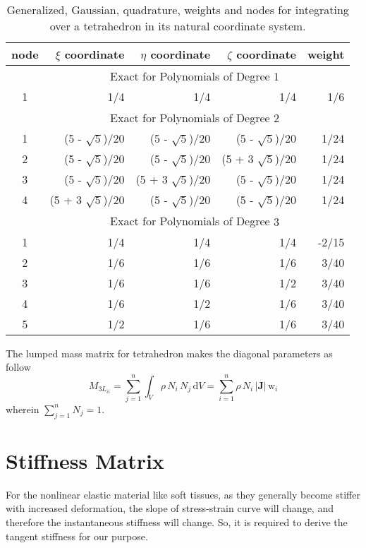 \begin{table}
    \centering
    \begin{tabular}{|c|rrrr|}
        \hline
        node & \centering $\xi$ coordinate \phantom{1234}  & 
        $\eta$ coordinate \phantom{1234} & 
        $\zeta$ coordinate \phantom{1234} & weight \phantom{12345} \\ \hline        
        & \multicolumn{4}{|c|}{Exact for Polynomials of Degree $1^{\phantom{|^|}}$} \\ 
        \hline
        1 & 1/4 & 1/4 & 1/4 & 1/6 \\ 
        \hline
        & \multicolumn{4}{|c|}{Exact for Polynomials of Degree $2^{\phantom{|^|}}$} \\ \hline
        1 & (5 - $\sqrt{5}$)/20 & (5 - $\sqrt{5}$)/20 & (5 - $\sqrt{5}$)/20 & 1/24\\
        2 & (5 - $\sqrt{5}$)/20 & (5 - $\sqrt{5}$)/20 & (5 + 3 $\sqrt{5}$)/20 & 1/24\\
        3 & (5 - $\sqrt{5}$)/20 & (5 + 3 $\sqrt{5}$)/20 & (5 - $\sqrt{5}$)/20 & 1/24\\ 
        4 & (5 + 3 $\sqrt{5}$)/20 & (5 - $\sqrt{5}$)/20 & (5 - $\sqrt{5}$)/20 & 1/24\\ 
        \hline
        & \multicolumn{4}{|c|}{Exact for Polynomials of Degree $3^{\phantom{|^|}}$} \\ \hline
        1 & 1/4 & 1/4 & 1/4 & -2/15 \\
        2 & 1/6 & 1/6 & 1/6 & 3/40\\
        3 & 1/6 & 1/6 & 1/2 & 3/40\\ 
        4 & 1/6 & 1/2 & 1/6 & 3/40 \\
        5 & 1/2 & 1/6 & 1/6 & 3/40 \\
        \hline
    \end{tabular}
    \caption{Generalized, Gaussian, quadrature, weights and nodes  for integrating over a tetrahedron in its natural coordinate system.}
    \label{tabQuadraturetetra}
\end{table}


The lumped mass matrix for tetrahedron makes the diagonal parameters as follow
\begin{equation}
{M}_{3L_{ii}} = \sum_{j=1}^n \int_{V}  \rho \, N_i \, N_j \, \mathrm{d} V = \sum_{i=1}^n  \rho  \, N_i\, |\mathbf{J}| \, \mathrm{w}_i
\label{LumMass3D}
\end{equation}
wherein $\sum_{j=1}^n N_j = 1$. 

\section{Stiffness Matrix}
For the nonlinear elastic material like soft tissues, as they generally become stiffer with increased deformation, the slope of stress-strain curve will change, and therefore the instantaneous stiffness will change. So, it is required to derive the tangent stiffness for our purpose. 

